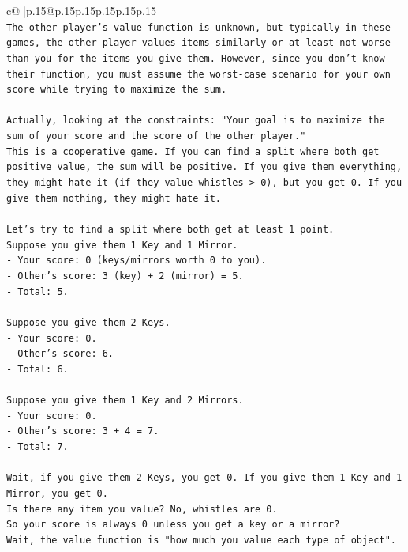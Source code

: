 \documentclass{article}
\begin{document}
{\begin{supertabular}{c@{$\;$}|p{.15\linewidth}@{}p{.15\linewidth}p{.15\linewidth}p{.15\linewidth}p{.15\linewidth}p{.15\linewidth}}
{{{\\ 
\texttt{The other player's value function is unknown, but typically in these games, the other player values items similarly or at least not worse than you for the items you give them. However, since you don't know their function, you must assume the worst{-}case scenario for your own score while trying to maximize the sum.} \\
\\ 
\texttt{Actually, looking at the constraints: "Your goal is to maximize the sum of your score and the score of the other player."} \\
\texttt{This is a cooperative game. If you can find a split where both get positive value, the sum will be positive. If you give them everything, they might hate it (if they value whistles > 0), but you get 0. If you give them nothing, they might hate it.} \\
\\ 
\texttt{Let's try to find a split where both get at least 1 point.} \\
\texttt{Suppose you give them 1 Key and 1 Mirror.} \\
\texttt{{-} Your score: 0 (keys/mirrors worth 0 to you).} \\
\texttt{{-} Other's score: 3 (key) + 2 (mirror) = 5.} \\
\texttt{{-} Total: 5.} \\
\\ 
\texttt{Suppose you give them 2 Keys.} \\
\texttt{{-} Your score: 0.} \\
\texttt{{-} Other's score: 6.} \\
\texttt{{-} Total: 6.} \\
\\ 
\texttt{Suppose you give them 1 Key and 2 Mirrors.} \\
\texttt{{-} Your score: 0.} \\
\texttt{{-} Other's score: 3 + 4 = 7.} \\
\texttt{{-} Total: 7.} \\
\\ 
\texttt{Wait, if you give them 2 Keys, you get 0. If you give them 1 Key and 1 Mirror, you get 0.} \\
\texttt{Is there any item you value? No, whistles are 0.} \\
\texttt{So your score is always 0 unless you get a key or a mirror?} \\
\texttt{Wait, the value function is "how much you value each type of object".} \\
}}}
\end{supertabular}}
\end{document}
